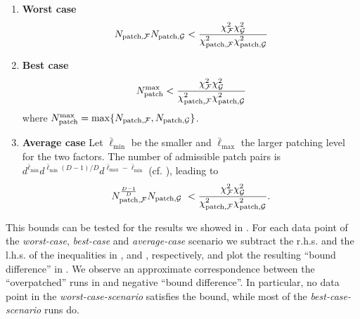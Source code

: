 \begingroup
\renewcommand{\labelenumi}{(\alph{enumi})}
    \begin{enumerate}
        \item \textbf{Worst case}
        \begin{equation}
          N_{\text{patch},\mathcal{F}}N_{\text{patch},\mathcal{G}}
    <\frac{\chi^2_{\mathcal{F}}\chi^2_{\mathcal{G}}}{\chi^2_{\text{patch},\mathcal{F}}\chi^2_{\text{patch},\mathcal{G}}}
            \label{eq:newworstBoundApp}
        \end{equation}
      \item \textbf{Best case}
        \begin{equation}
          N_{\text{patch}}^{\text{max}}
    <\frac{\chi^2_{\mathcal{F}}\chi^2_{\mathcal{G}}}{\chi^2_{\text{patch},\mathcal{F}}\chi^2_{\text{patch},\mathcal{G}}} 
            \label{eq:newbestBoundApp}
        \end{equation}
      where $N_{\text{patch}}^{\text{max}} = \max \{N_{\text{patch},\mathcal{F}},N_{\text{patch},\mathcal{G}}\}$.

     \item \textbf{Average case} Let \(\bar\ell_{\min}\) be the smaller and \(\bar\ell_{\max}\) the larger patching level for the two factors.  The number of admissible patch pairs is \(d^{\bar\ell_{\min}}d^{\bar\ell_{\min}(D-1)/D}d^{\bar\ell_{\max}-\bar\ell_{\min}}\) (cf. ), leading to
        \begin{equation}
          N^{\frac{D-1}{D}}_{\text{patch},\mathcal{F}}N_{\text{patch},\mathcal{G}}\
    <\frac{\chi^2_{\mathcal{F}}\chi^2_{\mathcal{G}}}{\chi^2_{\text{patch},\mathcal{F}}\chi^2_{\text{patch},\mathcal{G}}}.
            \label{eq:newaverageBoundApp}
        \end{equation}
    \end{enumerate}
\endgroup
This bounds can be tested for the results we showed in . For each data point of the \textit{worst-case}, \textit{best-case} and \textit{average-case} scenario we subtract the r.h.s. and the l.h.s. of the inequalities in ,  and , respectively, and plot the resulting ``bound difference'' in . We observe an approximate correspondence between the ``overpatched'' runs in  and negative ``bound difference''. In particular, no data point in the \textit{worst-case-scenario} satisfies the bound, while most of the \textit{best-case-scenario} runs do.

